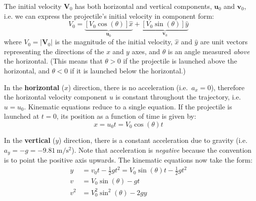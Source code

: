 \documentclass[11pt,titlepage,twoside]{article}
\newcommand{\xxx}{\hat x}
\newcommand{\yyy}{\hat y}
\begin{document}
The initial velocity $\mathbf V_0$ has both horizontal and vertical components,
$\mathbf u_0$ and $\mathbf v_0$, i.e. we can express the projectile's initial
velocity in component form:
\begin{equation}
  V_0=
  \underbrace{[V_0\cos(\theta)]\xxx}_{\mathbf u_0} +
  \underbrace{[V_0\sin(\theta)]\yyy}_{\mathbf v_0}
\end{equation}
where $V_0=|\mathbf V_0|$ is the magnitude of the initial velocity, $\xxx$
and $\yyy$ are unit vectors representing the directions of the $x$ and $y$
axes, and $\theta$ is an angle measured \emph{above} the horizontal. (This means
that $\theta>0$ if the projectile is launched above the horizontal, and
$\theta<0$ if it is launched below the horizontal.)

In the \textbf{horizontal} ($x$) direction, there is no acceleration (i.e.\
$a_x=0$), therefore the horizontal velocity component $u$ is constant
throughout the trajectory, i.e.\ $u=u_0$. Kinematic equations reduce to a
single equation. If the projectile is launched at $t=0$, its position as a
function of time is given by:
\begin{equation}
  x=u_0t=V_0\cos(\theta) t
  \label{horizontal}
\end{equation}

In the \textbf{vertical} ($y$) direction, there is a constant acceleration due
to gravity (i.e.\ $a_y=-g=\SI{-9.81}{\metre\per\second\squared}$). Note that
acceleration is \emph{negative} because the convention is to point the positive
axis upwards. The kinematic equations now take the form:
\begin{align}
  y &= v_0t - \frac12 gt^2
  = V_0\sin(\theta) t - \frac12 gt^2\label{vertical}\\
  v &= V_0\sin(\theta) -gt\\
  v^2 &= V_0^2\sin^2(\theta)-2gy\label{height}
\end{align}
\end{document}
